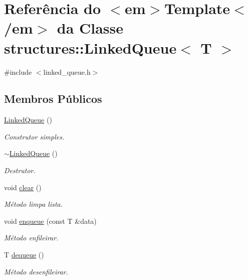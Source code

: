 \hypertarget{classstructures_1_1LinkedQueue}{}\section{Referência do $<$em$>$Template$<$/em$>$ da Classe structures\+::Linked\+Queue$<$ T $>$}
\label{classstructures_1_1LinkedQueue}


{\ttfamily \#include $<$linked\+\_\+queue.\+h$>$}

\subsection*{Membros Públicos}
\begin{DoxyCompactItemize}
\item 
\mbox{\hyperlink{classstructures_1_1LinkedQueue_aae2a207f04610f5bb460de8b4f5c7650}{Linked\+Queue}} ()
\begin{DoxyCompactList}\small\item\em Construtor simples. \end{DoxyCompactList}\item 
\mbox{\hyperlink{classstructures_1_1LinkedQueue_ad3f70a9465ecbf8868ad9206e2b01711}{$\sim$\+Linked\+Queue}} ()
\begin{DoxyCompactList}\small\item\em Destrutor. \end{DoxyCompactList}\item 
void \mbox{\hyperlink{classstructures_1_1LinkedQueue_a67dfb58a8feb96abccbd20862767e981}{clear}} ()
\begin{DoxyCompactList}\small\item\em Método limpa lista. \end{DoxyCompactList}\item 
void \mbox{\hyperlink{classstructures_1_1LinkedQueue_a6e9d6e444c5d534d01736bb82c34c815}{enqueue}} (const T \&data)
\begin{DoxyCompactList}\small\item\em Método enfileirar. \end{DoxyCompactList}\item 
T \mbox{\hyperlink{classstructures_1_1LinkedQueue_af6037408a07637554b8a8be7201a756d}{dequeue}} ()
\begin{DoxyCompactList}\small\item\em Método desenfileirar. \end{DoxyCompactList}\item 

\end{DoxyCompactItemize}
